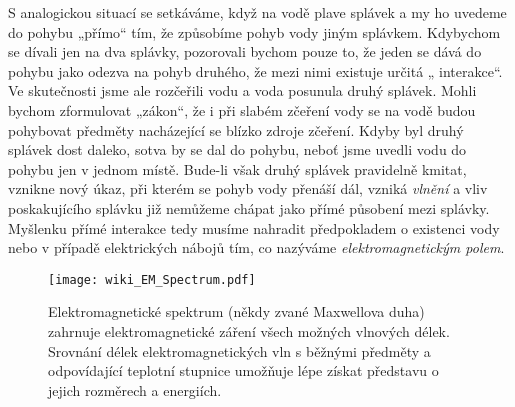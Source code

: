     S analogickou situací se setkáváme, když na vodě plave splávek a my ho uvedeme do pohybu „přímo“ tím, že 
    způsobíme pohyb vody jiným splávkem. Kdybychom se dívali jen na dva splávky, pozorovali bychom pouze to, 
    že jeden se dává do pohybu jako odezva na pohyb druhého, že mezi nimi existuje určitá „  interakce“. Ve 
    skutečnosti jsme ale rozčeřili vodu a voda posunula druhý splávek. Mohli bychom zformulovat „zákon“, že i 
    při slabém zčeření vody se na vodě budou pohybovat předměty nacházející se blízko zdroje zčeření. Kdyby 
    byl druhý splávek dost daleko, sotva by se dal do pohybu, neboť jsme uvedli vodu do pohybu jen v jednom 
    místě. Bude-li však druhý splávek pravidelně kmitat, vznikne nový úkaz, při kterém se pohyb vody přenáší 
    dál, vzniká \emph{vlnění} a vliv poskakujícího splávku již nemůžeme chápat jako přímé působení mezi 
    splávky. Myšlenku přímé interakce tedy musíme nahradit předpokladem o existenci vody nebo v případě 
    elektrických nábojů tím, co nazýváme \emph{elektromagnetickým polem}.

    \begin{figure}[ht!] %
      \centering
      \texttt{[image: wiki\_EM\_Spectrum.pdf]}
      \caption{Elektromagnetické spektrum (někdy zvané Maxwellova duha) zahrnuje elektromagnetické záření 
      všech možných vlnových délek. Srovnání délek elektromagnetických vln s běžnými předměty a odpovídající 
      teplotní stupnice umožňuje lépe získat představu o jejich rozměrech a energiích.}
      \label{FYZ:fig_base01}
    \end{figure}
    
